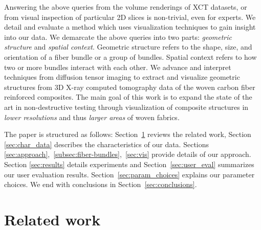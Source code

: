 Answering the above queries from the volume renderings of XCT datasets, or from visual inspection of particular 2D slices is non-trivial, even for experts. We detail and evaluate a method which uses visualization techniques to gain insight into our data. We demarcate the above queries into two parts: \textit{geometric structure} and \textit{spatial context}. Geometric structure refers to the shape, size, and orientation of a fiber bundle or a group of bundles. Spatial context refers to how two or more bundles interact with each other. 
We advance and interpret techniques from diffusion tensor imaging to extract and visualize geometric structures from 3D X-ray computed tomography data of the woven carbon fiber reinforced composites. The main goal of this work is to expand the state of the art in non-destructive testing through visualization of composite structures in \textit{lower resolutions} and thus \textit{larger areas} of woven fabrics.

The paper is structured as follows: Section~\ref{sec:prev_work} reviews the related work,  Section \ref{sec:char_data} describes the   characteristics of our data. Sections \ref{sec:approach},~\ref{subsec:fiber-bundles},~\ref{sec:vis} provide details of our approach. Section \ref{sec:results} details experiments and Section~\ref{sec:user_eval} summarizes our user evaluation results. Section~\ref{sec:param_choices} explains our  parameter choices. We end with conclusions in Section~\ref{sec:conclusions}.



\section {Related work}
\label{sec:prev_work}

